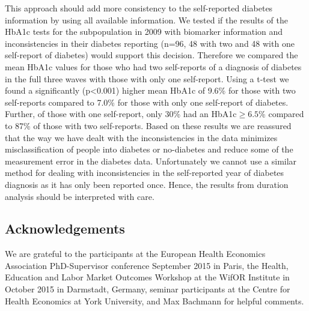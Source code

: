 \documentclass[12pt,english]{article}
\begin{document}
\begin{appendix}
This approach should add more consistency to the self-reported diabetes information by using all available information. We tested if the results of the \ac{HbA1c} tests for the subpopulation in 2009 with biomarker information and inconsistencies in their diabetes reporting (n=96, 48 with two and 48 with one self-report of diabetes) would support this decision. Therefore we compared the mean \ac{HbA1c} values for those who had two self-reports of a diagnosis of diabetes in the full three waves with those with only one self-report. Using a t-test we found a significantly (p<0.001) higher mean \ac{HbA1c} of 9.6\%
for those with two self-reports compared to 7.0\% for those with only one self-report of diabetes. Further, of those with one self-report, only 30\% had an \ac{HbA1c}$\geq6.5$\% compared to 87\% of those with two self-reports. Based on these results we are reassured that the way we have dealt with the inconsistencies in the data minimizes misclassification of people into diabetes or no-diabetes and reduce some of the measurement error in the diabetes data. Unfortunately we cannot use a similar method for dealing with inconsistencies in the self-reported year of diabetes diagnosis as it has only been reported once. Hence, the results from duration analysis should be interpreted with care.


\end{appendix}

\subsection*{Acknowledgements}

We are grateful to the participants at the European Health Economics Association PhD-Supervisor conference September 2015 in Paris, the Health, Education and Labor Market Outcomes Workshop at the WifOR Institute in October 2015 in Darmstadt, Germany, seminar participants at the Centre for Health Economics at York University, and Max Bachmann for helpful comments.
\end{document}
